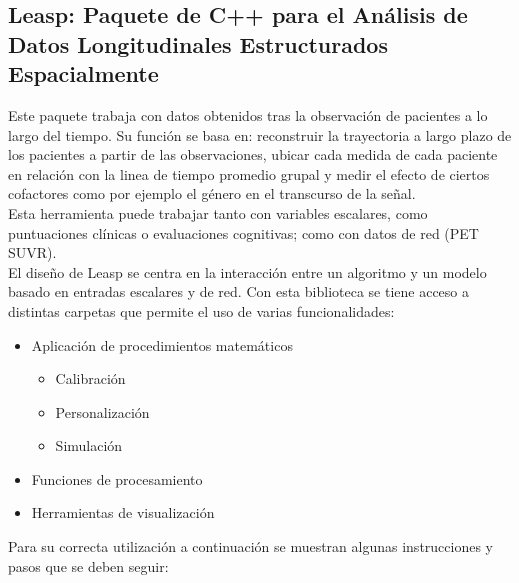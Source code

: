	\subsection{Leasp: Paquete de C++ para el Análisis de Datos Longitudinales Estructurados Espacialmente}
	
	Este paquete trabaja con datos obtenidos tras la observación de pacientes a lo
	largo del tiempo. Su función se basa en: reconstruir la trayectoria a largo
	plazo de los pacientes a partir de las observaciones, ubicar cada medida de cada
	paciente en relación con la linea de tiempo promedio grupal y medir el efecto de
	ciertos cofactores como por ejemplo el género en el transcurso de la señal.\\
	
	Esta herramienta puede trabajar tanto con variables escalares, como puntuaciones
	clínicas o evaluaciones cognitivas; como con 	datos de red (PET SUVR).\\
	
	El diseño de Leasp se centra en la interacción entre un algoritmo y un modelo
	basado en entradas escalares y de red. Con esta biblioteca se tiene acceso a
	distintas carpetas que permite el uso de varias funcionalidades:
	\begin{itemize}
		\item Aplicación de procedimientos matemáticos
		\begin{itemize}
			\item Calibración
			\item Personalización
			\item Simulación
		\end{itemize}
		\item Funciones de procesamiento
		\item Herramientas de visualización
	\end{itemize}
	
	Para su correcta utilización a continuación se muestran algunas instrucciones y
	pasos que se deben seguir:
	
